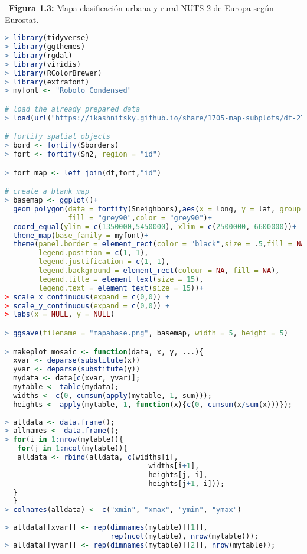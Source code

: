 \noindent \textbullet\hspace{0.3cm} \textbf{Figura 1.3:} Mapa clasificaci\'on urbana y rural NUTS-2 de Europa seg\'un Eurostat.

\begin{lstlisting}[language=R, caption=C\'odigo R para la elaboraci\'on de la clasificaci\'on urbana/rural regiones NUTS-2 correspondiente a la figura 1.3]
> library(tidyverse)
> library(ggthemes)
> library(rgdal)
> library(viridis)
> library(RColorBrewer)
> library(extrafont)
> myfont <- "Roboto Condensed"

# load the already prepared data
> load(url("https://ikashnitsky.github.io/share/1705-map-subplots/df-27-261-urb-rur.RData"))

# fortify spatial objects
> bord <- fortify(Sborders)
> fort <- fortify(Sn2, region = "id")

> fort_map <- left_join(df,fort,"id")

# create a blank map
> basemap <- ggplot()+
  geom_polygon(data = fortify(Sneighbors),aes(x = long, y = lat, group = group),
               fill = "grey90",color = "grey90")+
  coord_equal(ylim = c(1350000,5450000), xlim = c(2500000, 6600000))+
  theme_map(base_family = myfont)+
  theme(panel.border = element_rect(color = "black",size = .5,fill = NA),
        legend.position = c(1, 1),
        legend.justification = c(1, 1),
        legend.background = element_rect(colour = NA, fill = NA),
        legend.title = element_text(size = 15),
        legend.text = element_text(size = 15))+
> scale_x_continuous(expand = c(0,0)) +
> scale_y_continuous(expand = c(0,0)) +
> labs(x = NULL, y = NULL)

> ggsave(filename = "mapabase.png", basemap, width = 5, height = 5)

> makeplot_mosaic <- function(data, x, y, ...){
  xvar <- deparse(substitute(x))
  yvar <- deparse(substitute(y))
  mydata <- data[c(xvar, yvar)];
  mytable <- table(mydata);
  widths <- c(0, cumsum(apply(mytable, 1, sum)));
  heights <- apply(mytable, 1, function(x){c(0, cumsum(x/sum(x)))});
  
> alldata <- data.frame();
> allnames <- data.frame();
> for(i in 1:nrow(mytable)){
   for(j in 1:ncol(mytable)){
   alldata <- rbind(alldata, c(widths[i], 
                                  widths[i+1], 
                                  heights[j, i], 
                                  heights[j+1, i]));
  }
  }
> colnames(alldata) <- c("xmin", "xmax", "ymin", "ymax")
  
> alldata[[xvar]] <- rep(dimnames(mytable)[[1]], 
                         rep(ncol(mytable), nrow(mytable)));
> alldata[[yvar]] <- rep(dimnames(mytable)[[2]], nrow(mytable));
  

\end{lstlisting}

